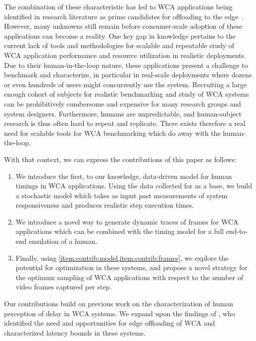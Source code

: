 The combination of these characteristic has led to \ac{WCA} applications being identified in research literature as prime candidates for offloading to the edge~\cite{Ha2014towards,Chen2017Empirical,Chen2018application}.
However, many unknowns still remain before consumer-scale adoption of these applications can become a reality.
One key gap in knowledge pertains to the current lack of tools and methodologies for scalable and repeatable study of \ac{WCA} application performance and resource utilization in realistic deployments.
Due to their human-in-the-loop nature, these applications present a challenge to benchmark and characterize, in particular in real-scale deployments where dozens or even hundreds of users might concurrently use the system.
Recruiting a large enough cohort of subjects for realistic benchmarking and study of \ac{WCA} systems can be prohibitively cumbersome and expensive for many research groups and system designers.
Furthermore, humans are unpredictable, and human-subject research is thus often hard to repeat and replicate.
There exists therefore a real need for scalable tools for \ac{WCA} benchmarking which do away with the human-the-loop.

\medskip

With that context, we can express the contributions of this paper as follows:
\begin{enumerate}
    \item\label{item:contrib:model} We introduce the first, to our knowledge, data-driven model for human timings in \ac{WCA} applications.
    Using the data collected for \textcite{olguinmunoz:impact2021} as a base, we build a stochastic model which takes as input past measurements of system responsiveness and produces realistic step execution times.
    \item\label{item:contrib:frames} We introduce a novel way to generate dynamic traces of frames for \ac{WCA} applications which can be combined with the timing model for a full end-to-end emulation of a human.
    \item Finally, using \cref{item:contrib:model,item:contrib:frames}, we explore the potential for optimization in these systems, and propose a novel strategy for the optimum sampling of \ac{WCA} applications with respect to the number of video frames captured per step.
\end{enumerate}

Our contributions build on previous work on the characterization of human perception of delay in \ac{WCA} systems.
We expand upon the findings of \textcite{Ha2014towards,Chen2017Empirical}, who identified the need and opportunities for edge offloading of \ac{WCA} and characterized latency bounds in these systems.

